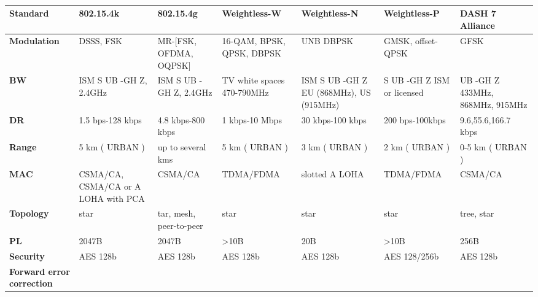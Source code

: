\begin{table}[h!]
\scriptsize
	\begin{tabulary}{\textwidth}{L|L|L|L|L|L|L}
	\textbf{Standard}                & \textbf{802.15.4k}                  & \textbf{802.15.4g}      & \textbf{Weightless-W}      & \textbf{Weightless-N}                   & \textbf{Weightless-P}      & \textbf{DASH 7 Alliance}\\\hline
	\textbf{Modulation}              & DSSS, FSK                           & MR-[FSK, OFDMA, OQPSK]  & 16-QAM, BPSK, QPSK, DBPSK  & UNB DBPSK                               & GMSK, offset-QPSK          & GFSK\\\hline
	\textbf{\ac{BW}}                    & ISM S UB -GH Z, 2.4GHz              & ISM S UB -GH Z, 2.4GHz  & TV white spaces 470-790MHz & ISM S UB -GH Z EU (868MHz), US (915MHz) & S UB -GH Z ISM or licensed & UB -GH Z 433MHz, 868MHz, 915MHz\\\hline
	\textbf{\ac{DR}}                 & 1.5 bps-128 kbps                    & 4.8 kbps-800 kbps       & 1 kbps-10 Mbps             & 30 kbps-100 kbps                        & 200 bps-100kbps            & 9.6,55.6,166.7 kbps\\\hline
	\textbf{Range}                   & 5 km ( URBAN )                      & up to several kms       & 5 km ( URBAN )             & 3 km ( URBAN )                          & 2 km ( URBAN )             & 0-5 km ( URBAN )\\\hline
	\textbf{MAC}                     & CSMA/CA, CSMA/CA or A LOHA with PCA & CSMA/CA                 & TDMA/FDMA                  & slotted A LOHA                          & TDMA/FDMA                  & CSMA/CA \\\hline
	\textbf{Topology}                & star                                & tar, mesh, peer-to-peer & star                       & star                                    & star                       & tree, star\\\hline
	\textbf{\ac{PL}}                 & 2047B                               & 2047B                   & >10B                       & 20B                                     & >10B                       & 256B \\\hline
	\textbf{Security}                & AES 128b                            & AES 128b                & AES 128b                   & AES 128b                                & AES 128/256b               & AES 128b \\\hline
	\textbf{Forward error correction}& \ok                                 & \ok                     & \ok                        & \ko                                     & \ok                        & \ok\\\hline
	\end{tabulary}
\caption{\label{tab:uyuy} \cite{raza_low_22}}
\end{table}

